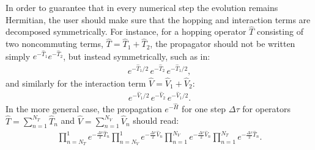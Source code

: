 In order to guarantee that in every numerical step the evolution remains Hermitian, the user should make sure that the hopping and interaction terms are decomposed symmetrically. For instance, for a hopping operator $\hat{T}$ consisting of two noncommuting terms, $\hat{T}=\hat{T}_1+\hat{T}_2$, the propagator should not be written simply $e^{-\hat{T}_1}e^{-\hat{T}_2} $, but instead symmetrically, such as in:
\begin{align}
e^{-\hat{T}_1/2}\, e^{-\hat{T}_2}\, e^{-\hat{T}_1/2},
\end{align}
and similarly for the interaction term $\hat{V}=\hat{V}_1+\hat{V}_2$:
\begin{align}
e^{-\hat{V}_1/2}\, e^{-\hat{V}_2}\, e^{-\hat{V}_1/2}.
\end{align} 
In the more general case, the propagation $e^{-\hat{H}}$ for one step $\Delta \tau$ for operators $\hat{T}= \sum_{n=1}^{N_T} \hat{T}_n$ and $\hat{V}= \sum_{n=1}^{N_V} \hat{V}_n$ should read:
\begin{align}
\prod_{n=N_T}^{1}e^{-\frac{\Delta \tau}{2} \hat{T}_n}
\prod_{n=N_V}^{1}e^{-\frac{\Delta \tau}{2} \hat{V}_n}  \prod_{n=1}^{N_V}e^{-\frac{\Delta \tau}{2} \hat{V}_n}
\prod_{n=1}^{N_T}e^{-\frac{\Delta \tau}{2} \hat{T}_n}.
\end{align}

